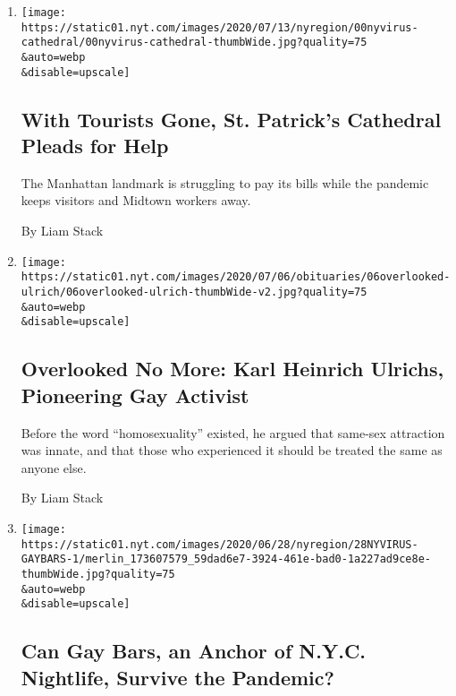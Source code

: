 \begin{enumerate}
\def\labelenumi{\arabic{enumi}.}
\item
  \href{/2020/07/19/nyregion/st-patricks-cathedral-pandemic-budget.html}{}

  \texttt{[image: https://static01.nyt.com/images/2020/07/13/nyregion/00nyvirus-cathedral/00nyvirus-cathedral-thumbWide.jpg?quality=75\\\&auto=webp\\\&disable=upscale]}

  \hypertarget{with-tourists-gone-st-patricks-cathedral-pleads-for-help}{%
  \subsection{With Tourists Gone, St. Patrick's Cathedral Pleads for
  Help}\label{with-tourists-gone-st-patricks-cathedral-pleads-for-help}}

  The Manhattan landmark is struggling to pay its bills while the
  pandemic keeps visitors and Midtown workers away.

  By Liam Stack
\item
  \href{/2020/07/01/obituaries/karl-heinrich-ulrichs-overlooked.html}{}

  \texttt{[image: https://static01.nyt.com/images/2020/07/06/obituaries/06overlooked-ulrich/06overlooked-ulrich-thumbWide-v2.jpg?quality=75\\\&auto=webp\\\&disable=upscale]}

  \hypertarget{overlooked-no-more-karl-heinrich-ulrichs-pioneering-gay-activist}{%
  \subsection{Overlooked No More: Karl Heinrich Ulrichs, Pioneering Gay
  Activist}\label{overlooked-no-more-karl-heinrich-ulrichs-pioneering-gay-activist}}

  Before the word ``homosexuality'' existed, he argued that same-sex
  attraction was innate, and that those who experienced it should be
  treated the same as anyone else.

  By Liam Stack
\item
  \href{/2020/06/20/nyregion/nyc-gay-bars-pride.html}{}

  \texttt{[image: https://static01.nyt.com/images/2020/06/28/nyregion/28NYVIRUS-GAYBARS-1/merlin\_173607579\_59dad6e7-3924-461e-bad0-1a227ad9ce8e-thumbWide.jpg?quality=75\\\&auto=webp\\\&disable=upscale]}

  \hypertarget{can-gay-bars-an-anchor-of-nyc-nightlife-survive-the-pandemic}{%
  \subsection{Can Gay Bars, an Anchor of N.Y.C. Nightlife, Survive the
  Pandemic?}\label{can-gay-bars-an-anchor-of-nyc-nightlife-survive-the-pandemic}}


\end{enumerate}
